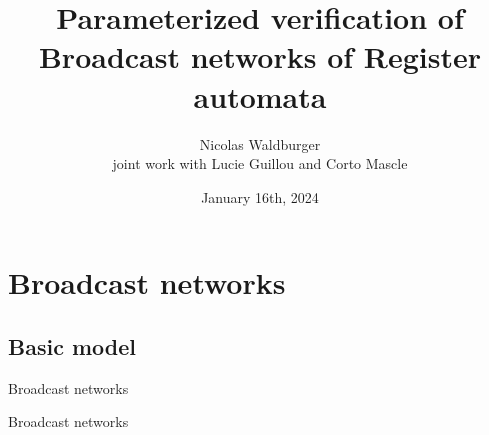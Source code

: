 \documentclass{beamer}
\begin{document}
	
	\title[]{Parameterized verification of Broadcast networks of Register automata}
	\date[]{January 16th, 2024}
	\author[Nicolas Waldburger]{Nicolas Waldburger\\ joint work with Lucie Guillou and Corto Mascle}
%	
\begin{frame}
	\titlepage
\end{frame}	

\begin{frame}
	\tableofcontents
\end{frame}

\section{Broadcast networks}

\subsection{Basic model}

\begin{frame}
	\tableofcontents[currentsection]
\end{frame}


\begin{frame}{Broadcast networks}
	\centering
	
\end{frame}


\begin{frame}{Broadcast networks}
	\centering
	
\end{frame}
\end{document}
